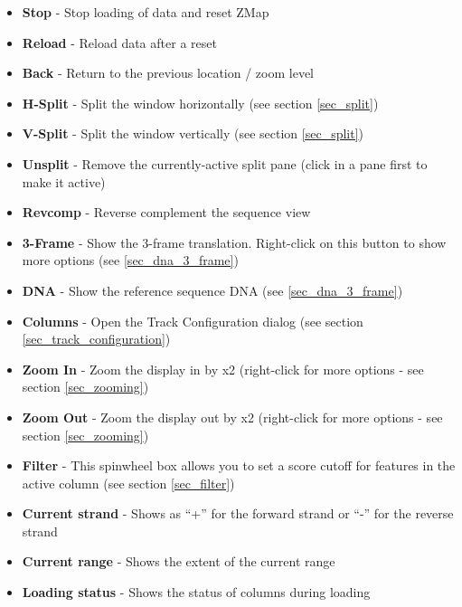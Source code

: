 \documentclass[letterpaper]{article}
\begin{document}
\begin{itemize}
\item \textbf{Stop} - Stop loading of data and reset ZMap
\item \textbf{Reload} - Reload data after a reset
\item \textbf{Back} - Return to the previous location / zoom level
\item \textbf{H-Split} - Split the window horizontally (see section \ref{sec_split})
\item \textbf{V-Split} - Split the window vertically (see section \ref{sec_split})
\item \textbf{Unsplit} - Remove the currently-active split pane (click in a pane first to make it active)
\item \textbf{Revcomp} - Reverse complement the sequence view
\item \textbf{3-Frame} - Show the 3-frame translation. Right-click on this button to show more options (see \ref{sec_dna_3_frame})
\item \textbf{DNA} - Show the reference sequence DNA  (see \ref{sec_dna_3_frame})
\item \textbf{Columns} - Open the Track Configuration dialog (see section \ref{sec_track_configuration})
\item \textbf{Zoom In} - Zoom the display in by x2 (right-click for more options - see section \ref{sec_zooming})
\item \textbf{Zoom Out} - Zoom the display out by x2 (right-click for more options - see section \ref{sec_zooming})
\item \textbf{Filter} - This spinwheel box allows you to set a score cutoff for features in the active column (see section \ref{sec_filter})
\item \textbf{Current strand} - Shows as ``+'' for the forward strand or ``-'' for the reverse strand
\item \textbf{Current range} - Shows the extent of the current range
\item \textbf{Loading status} - Shows the status of columns during loading
\end{itemize}
\end{document}
